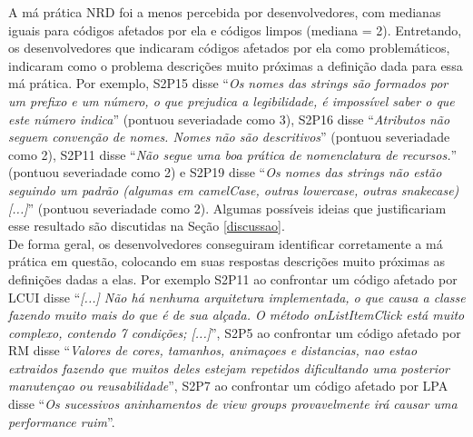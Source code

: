 A má prática NRD foi a menos percebida por desenvolvedores, com medianas iguais para códigos afetados por ela e códigos limpos (mediana = 2). Entretando, os desenvolvedores que indicaram códigos afetados por ela como problemáticos, indicaram como o problema descrições muito próximas a definição dada para essa má prática. Por exemplo, S2P15 disse ``\textit{Os nomes das strings são formados por um prefixo e um número, o que prejudica a legibilidade, é impossível saber o que este número indica}'' (pontuou severiadade como 3), S2P16 disse ``\textit{Atributos não seguem convenção de nomes. Nomes não são descritivos}'' (pontuou severiadade como 2), S2P11 disse ``\textit{Não segue uma boa prática de nomenclatura de recursos.}'' (pontuou severiadade como 2) e S2P19 disse ``\textit{Os nomes das strings não estão seguindo um padrão (algumas em camelCase, outras lowercase, outras snakecase) [...]}'' (pontuou severiadade como 2). Algumas possíveis ideias que justificariam esse resultado são discutidas na Seção \ref{discussao}. \\

De forma geral, os desenvolvedores conseguiram identificar corretamente a má prática em questão, colocando em suas respostas descrições muito próximas as definições dadas a elas. Por exemplo S2P11 ao confrontar um código afetado por LCUI disse ``\textit{[...] Não há nenhuma arquitetura implementada, o que causa a classe fazendo muito mais do que é de sua alçada. O método onListItemClick está muito complexo, contendo 7 condições; [...]}'', S2P5 ao confrontar um código afetado por RM disse ``\textit{Valores de cores, tamanhos, animaçoes e distancias, nao estao extraidos fazendo que muitos deles estejam repetidos dificultando uma posterior manutençao ou reusabilidade}'', S2P7 ao confrontar um código afetado por LPA disse ``\textit{Os sucessivos aninhamentos de view groups provavelmente irá causar uma performance ruim}''.

